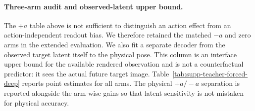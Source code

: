 \documentclass{article}
\begin{document}
\paragraph{Three-arm audit and observed-latent upper bound.}
The $+a$ table above is not sufficient to distinguish an action effect from
an action-independent readout bias. We therefore retained the matched $-a$
and zero arms in the extended evaluation. We also fit a separate decoder
from the observed target latent itself to the physical pose. This column is
an interface upper bound for the available rendered observation and is not a
counterfactual predictor: it sees the actual future target image. Table~\ref{tab:supp-teacher-forced-deep}
reports point estimates for all arms. The physical $+a/-a$ separation is
reported alongside the arm-wise gains so that latent sensitivity is not
mistaken for physical accuracy.

\begin{table}[H]
\centering
\scriptsize
\setlength{\tabcolsep}{3pt}
\caption{Extended teacher-forced repair audit. Errors are block-XY pixels;
the observed-latent column is fit to the actual target latent and therefore
serves only as an observation/readout upper bound. Gains are base error minus
repaired-calibrated error, so positive values favor the repair.}
\label{tab:supp-teacher-forced-deep}
\end{table}
\end{document}
